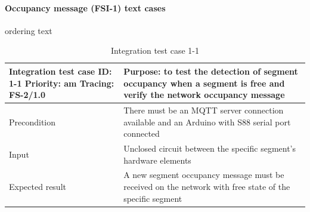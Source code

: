 \paragraph{Occupancy message (FSI-1) text cases} ordering text
\begin{table}[H]
	\caption{Integration test case 1-1}
	\label{table:TCase-FSI1-1}
	\begin{center}
		\renewcommand{\arraystretch}{1.8}
		\begin{tabu} 
			to 0.9 \textwidth
			{  X[0.4, c] X[c] }
			\toprule
			Integration test case ID: 1-1 \newline Priority: am \newline Tracing: FS-2/1.0 & Purpose: to test the detection of segment occupancy when a segment is free and verify the network occupancy message \\ \midrule
			Precondition                                                                   & There must be an MQTT server connection available and an Arduino with S88 serial port connected                     \\
			Input                                                                          & Unclosed circuit between the specific segment's hardware elements                                                   \\
			Expected result                                                                & A new segment occupancy message must be received on the network with free state of the specific segment             \\ \bottomrule
		\end{tabu}
	\end{center}
\end{table} 

